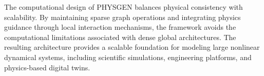 The computational design of PHYSGEN balances physical consistency with scalability. By maintaining sparse graph operations and integrating physics guidance through local interaction mechanisms, the framework avoids the computational limitations associated with dense global architectures. The resulting architecture provides a scalable foundation for modeling large nonlinear dynamical systems, including scientific simulations, engineering platforms, and physics-based digital twins. \] 